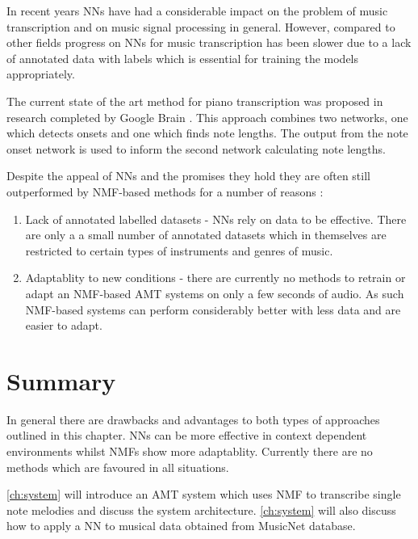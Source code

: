 In recent years \ac{NN}s have had a considerable impact on the problem of music
transcription and on music signal processing in general. However, compared to
other fields progress on \ac{NN}s for music transcription has been slower due to a
lack of annotated data with labels which is essential for training the models
appropriately. \cite{end-to-end-transcription2017:Carvalho}

The current state of the art method for piano transcription was proposed in
research completed by Google Brain \cite{google2018:Elsen}. This approach
combines two networks, one which detects onsets and one which finds note
lengths. The output from the note onset network is used to inform the second
network calculating note lengths.

Despite the appeal of NNs and the promises they hold they are often still
outperformed by \ac{NMF}-based methods for a number of reasons :
\begin{enumerate}
  \item Lack of annotated labelled datasets - \ac{NN}s rely on data to be
        effective. There are only a a small number of annotated datasets which
        in themselves are restricted to certain types of instruments and genres
        of music. \cite{ground-truths:Su}
  \item Adaptablity to new conditions - there are currently no methods to
        retrain or adapt an \ac{NMF}-based \ac{AMT} systems on only a few seconds of audio.
        As such \ac{NMF}-based systems can perform considerably better with less data
        and are easier to adapt.
\end{enumerate}

\section{Summary}

In general there are drawbacks and advantages to both types of approaches
outlined in this chapter. \ac{NN}s can be more effective in context dependent
environments whilst \ac{NMF}s show more adaptablity. Currently there are no methods
which are favoured in all situations.

\autoref{ch:system} will introduce an \ac{AMT} system which uses \ac{NMF} to transcribe
single note melodies and discuss the system architecture. \autoref{ch:system}
will also discuss how to apply a \ac{NN} to musical data obtained from
\citeyear{thickstun2018invariances} MusicNet database.